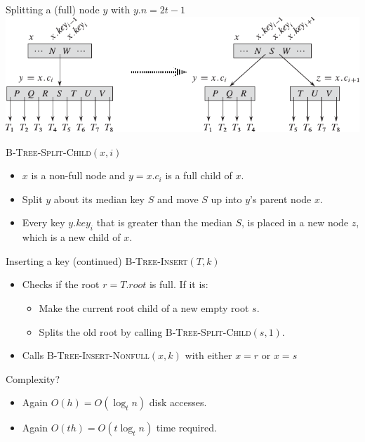 \documentclass[11pt,t]{beamer}
\begin{document}
	\begin{frame}{Splitting a (full) node \(y\) with \(y.n = 2t-1\)}
		\centering
		\includegraphics[width=.7\textwidth]{images/splitting}
		\vspace{0.3cm}

		\raggedright
		\onslide<+->\textsc{B-Tree-Split-Child}\((x,i)\)
		\begin{itemize}[<+->]
			\item \(x\) is a non-full node and \(y=x.c_i\) is a full child of \(x\).
			\item Split \(y\) about its median key \(S\) and move \(S\) up into \(y\)'s parent node \(x\).
			\item Every key \(y.key_i\) that is greater than the median \(S\), is placed in a new node \(z\), which is a new child of \(x\).
		\end{itemize}
	\end{frame}

	\begin{frame}{Inserting a key (continued)}
		\pause
		\textsc{B-Tree-Insert}\((T,k)\)
			\begin{itemize}[<+->]
				\item Checks if the root \(r=T.root\) is full. If it is: \begin{itemize}
				\item Make the current root child of a new empty root \(s\).
				\item Splits the old root by calling \textsc{B-Tree-Split-Child}\((s,1)\).
			\end{itemize}
			\item Calls \textsc{B-Tree-Insert-Nonfull}\((x,k)\) with either \(x=r\) or \(x=s\)
			\vspace{0.6cm}
		\end{itemize}
		\onslide<+-> Complexity?
		\begin{itemize}[<+->]
			\item Again \(O(h) = O(\log_t n)\) disk accesses.
			\item Again \(O(th)=O(t \log_t n)\) time required.
		\end{itemize}
	\end{frame}
\end{document}
